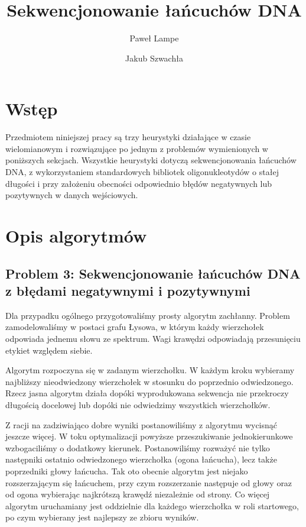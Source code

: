 \documentclass[a4paper]{article}
\title{\textbf{Sekwencjonowanie łańcuchów DNA}}
\date{}
\author{Paweł Lampe \and Jakub Szwachła}
\begin{document}
\maketitle

\section{Wstęp}

Przedmiotem niniejszej pracy są trzy heurystyki działające w czasie wielomianowym i rozwiązujące po jednym z problemów
wymienionych w poniższych sekcjach. Wszystkie heurystyki dotyczą sekwencjonowania łańcuchów DNA, z wykorzystaniem
standardowych bibliotek oligonukleotydów o stałej długości i przy założeniu obecności odpowiednio błędów negatywnych lub
pozytywnych w danych wejściowych.

\section{Opis algorytmów}

\subsection{Problem 3: Sekwencjonowanie łańcuchów DNA z błędami negatywnymi i pozytywnymi}      %

Dla przypadku ogólnego przygotowaliśmy prosty algorytm zachłanny. Problem zamodelowaliśmy w postaci grafu Łysowa,
w którym każdy wierzchołek odpowiada jednemu słowu ze spektrum. Wagi krawędzi odpowiadają przesunięciu etykiet
względem siebie.

Algorytm rozpoczyna się w zadanym wierzchołku. W każdym kroku wybieramy najbliższy nieodwiedzony wierzchołek w stosunku
do poprzednio odwiedzonego. Rzecz jasna algorytm działa dopóki wyprodukowana sekwencja nie przekroczy długością docelowej
lub dopóki nie odwiedzimy wszystkich wierzchołków.

Z racji na zadziwiająco dobre wyniki postanowiliśmy z algorytmu wycisnąć jeszcze więcej. W toku optymalizacji powyższe
przeszukiwanie jednokierunkowe wzbogaciliśmy o dodatkowy kierunek. Postanowiliśmy rozważyć nie tylko następniki ostatnio
odwiedzonego wierzchołka (ogona łańcucha), lecz także poprzedniki głowy łańcucha. Tak oto obecnie
algorytm jest niejako rozszerzającym się łańcuchem, przy czym rozszerzanie następuje od głowy oraz od ogona
wybierając najkrótszą krawędź niezależnie od strony. Co więcej algorytm uruchamiany jest oddzielnie dla każdego
wierzchołka w roli startowego, po czym wybierany jest najlepszy ze zbioru wyników.
\end{document}
